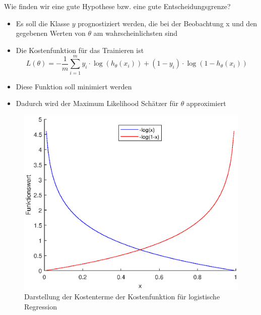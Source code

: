 \begin{frame}
Wie finden wir eine gute Hypothese bzw. eine gute Entscheidungsgrenze?
\begin{itemize}[<+->]
\item Es soll die Klasse $y$ prognostiziert werden, die bei der Beobachtung x und den gegebenen Werten von $\theta$ am wahrscheinlichsten sind
\item Die Kostenfunktion für das Trainieren ist
\[
L(\theta) = -\frac{1}{m} \sum_{i=1}^m y_i \cdot \log(h_\theta(x_i)) + (1-y_i)\cdot\log(1-h_\theta(x_i))
\]
\item Diese Funktion soll minimiert werden
\item Dadurch wird der Maximum Likelihood Schätzer für $\theta$ approximiert
\end{itemize}
\end{frame}
\begin{frame}
\begin{figure}[hbtp]
\centering
\includegraphics[scale=0.6]{images/plot_costs_logreg.eps}
\caption{Darstellung der Kostenterme der Kostenfunktion für logistische Regression}
\end{figure}
\end{frame}
